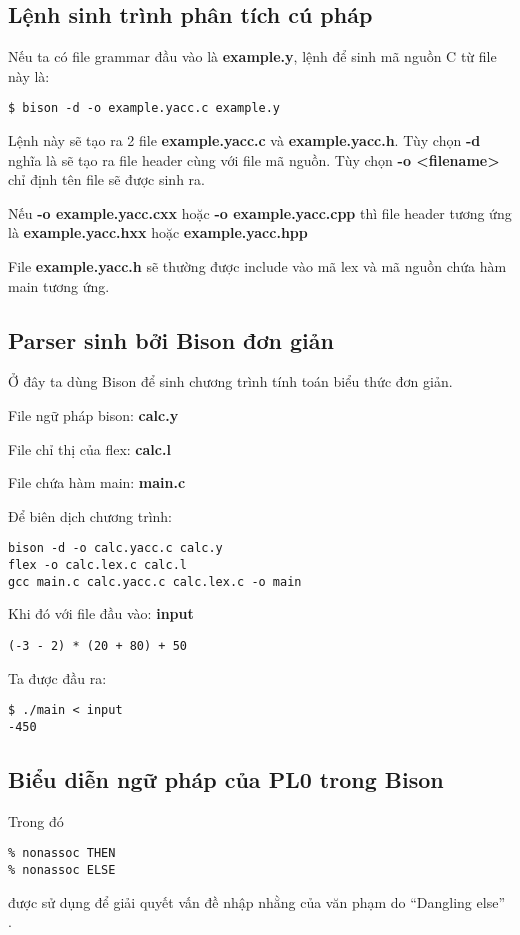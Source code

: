 \documentclass[../report.tex]{subfiles}
\begin{document}
\subsection{Lệnh sinh trình phân tích cú pháp}
Nếu ta có file grammar đầu vào là \textbf{example.y}, 
lệnh để sinh mã nguồn C từ file này là: 
\begin{verbatim}
$ bison -d -o example.yacc.c example.y
\end{verbatim}
Lệnh này sẽ tạo ra 2 file \textbf{example.yacc.c} và 
\textbf{example.yacc.h}. 
Tùy chọn \textbf{-d} nghĩa là sẽ tạo ra file header 
cùng với file mã nguồn. Tùy chọn \textbf{-o <filename>} 
chỉ định tên file sẽ được sinh ra. 

Nếu \textbf{-o example.yacc.cxx} hoặc \textbf{-o example.yacc.cpp}
thì file header tương 
ứng là \textbf{example.yacc.hxx} hoặc \textbf{example.yacc.hpp}

File \textbf{example.yacc.h} sẽ thường được include vào 
mã lex và mã nguồn chứa hàm main tương ứng. 

\subsection{Parser sinh bởi Bison đơn giản}
Ở đây ta dùng Bison để sinh chương trình tính toán 
biểu thức đơn giản.

File ngữ pháp bison: \textbf{calc.y}


File chỉ thị của flex: \textbf{calc.l}


File chứa hàm main: \textbf{main.c}


Để biên dịch chương trình: 
\begin{verbatim}
bison -d -o calc.yacc.c calc.y
flex -o calc.lex.c calc.l
gcc main.c calc.yacc.c calc.lex.c -o main
\end{verbatim}
 
Khi đó với file đầu vào: \textbf{input}
\begin{verbatim}
(-3 - 2) * (20 + 80) + 50
\end{verbatim}

Ta được đầu ra: 
\begin{verbatim}
$ ./main < input
-450
\end{verbatim}

\subsection{Biểu diễn ngữ pháp của PL0 trong Bison} 

Trong đó 
\begin{lstlisting}
% nonassoc THEN
% nonassoc ELSE
\end{lstlisting}
được sử dụng để giải quyết vấn đề nhập nhằng của 
văn phạm do ``Dangling else'' 
\cite{dangling-else} \cite{dangling-else-book}.
\end{document}
